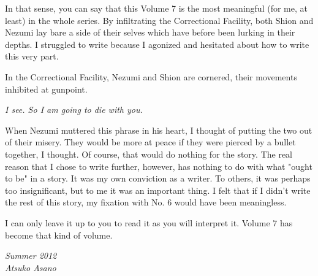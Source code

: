 In that sense, you can say that this Volume 7 is the most meaningful (for me, at least) in the whole series. By infiltrating the Correctional Facility, both Shion and Nezumi lay bare a side of their selves which have before been lurking in their depths. I struggled to write because I agonized and hesitated about how to write this very part.

In the Correctional Facility, Nezumi and Shion are cornered, their movements inhibited at gunpoint.

\emph{I see. So I am going to die with you.}

When Nezumi muttered this phrase in his heart, I thought of putting the two out of their misery. They would be more at peace if they were pierced by a bullet together, I thought. Of course, that would do nothing for the story. The real reason that I chose to write further, however, has nothing to do with what "ought to be" in a story. It was my own conviction as a writer. To others, it was perhaps too insignificant, but to me it was an important thing. I felt that if I didn't write the rest of this story, my fixation with No. 6 would have been meaningless.

I can only leave it up to you to read it as you will interpret it. Volume 7 has become that kind of volume.

\myspace

\emph{Summer 2012\\
	Atsuko Asano}